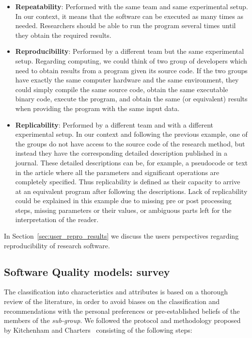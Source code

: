 \begin{itemize}
    \item \textbf{Repeatability}: Performed with the same team and same experimental setup. In our context, it means that the software can be executed as many times as needed. Researchers should be able to run the program several times until they obtain the required results.
    
    \item \textbf{Reproducibility}: Performed by a different team but the same experimental setup. Regarding computing, we could think of two group of developers which need to obtain results from a program given its source code. If the two groups have exactly the same computer hardware and the same environment, they could simply compile the same source code, obtain the same executable binary code, execute the program, and obtain the same (or equivalent) results when providing the program with the same input data.

    \item \textbf{Replicability}: Performed by a different team and with a different experimental setup. In our context and following the previous example, one of the groups do not have access to the source code of the research method, but instead they have the corresponding detailed description published in a journal. These detailed descriptions can be, for example, a pseudocode or text in the article where all the parameters and significant operations are completely specified. Thus replicability is defined as their capacity to arrive at an equivalent program after following the descriptions. Lack of replicability could be explained in this example due to missing pre or post processing steps, missing parameters or their values, or ambiguous parts left for the interpretation of the reader.
\end{itemize}

In Section~\ref{sec:user_repro_results} we discuss the users perspectives regarding reproducibility of research software.

\subsection{Software Quality models: survey}
\label{subsec:sqm_survey}

The classification into characteristics and attributes is based on a thorough review of the literature, in order to avoid biases on the classification and recommendations with the personal preferences or pre-established beliefs of the members of the \textit{sub-group}. We followed the protocol and methodology proposed by Kitchenham and Charters~\cite{keele2007guidelines} consisting of the following steps:

